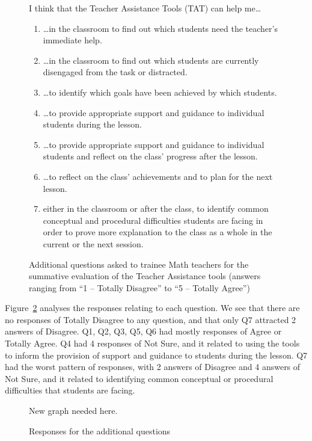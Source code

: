 \begin{figure}[htb!]
  \begin{framed}
  I think that the Teacher Assistance Tools (TAT) can help me\ldots
  \begin{enumerate}
  \item \ldots in the
    classroom to find out which students need the teacher's immediate
    help.
  \item \ldots in the classroom to find out which students are
    currently disengaged from the task or distracted.
  \item \ldots to identify which goals have been achieved by which
    students.
  \item \ldots to provide appropriate support and guidance to individual
    students during the lesson.
  \item \ldots to provide appropriate support and guidance to individual
    students and reflect on the class' progress after the lesson.
  \item \ldots to reflect on the class' achievements and to plan for
    the next lesson.
  \item either in the classroom or after the class, to identify common
    conceptual and procedural difficulties students are facing in
    order to prove more explanation to the class as a whole in the
    current or the next session.
  \end{enumerate}
  \end{framed}
  \vspace{-1em}
  \caption{Additional questions asked to trainee Math teachers for the
    summative evaluation of the Teacher Assistance tools (answers
    ranging from ``1 -- Totally Disagree'' to ``5 -- Totally Agree'')} 
  \label{fig:questions2-pgce}    
\end{figure}


Figure~\ref{fig:sjadsfnasdf} analyses the responses relating to each
question. We 
see that there are no responses of Totally Disagree to any question,
and that only Q7 attracted 2 answers of Disagree. Q1, Q2, Q3, Q5, Q6
had mostly responses of Agree or Totally Agree. Q4 had 4 responses of
Not Sure, and it related to using the tools to inform the provision of
support and guidance to students during the lesson. Q7 had the worst
pattern of responses, with 2 answers of Disagree and 4 answers of Not
Sure, and it related to identifying common conceptual or procedural
difficulties that students are facing.

\begin{figure}[htbp]
  \centering
  New graph needed here. 
  \caption{Responses for the additional questions} 
\label{fig:sjadsfnasdf}
\end{figure}



